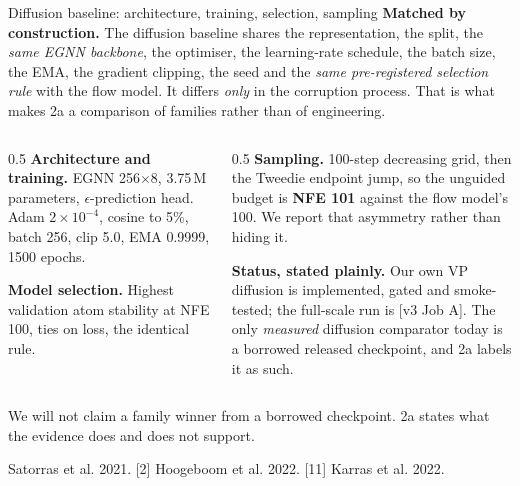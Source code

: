 \documentclass[aspectratio=169,10pt]{beamer}
\newcommand{\theslidelabel}{}
\newcommand{\lbl}[1]{\renewcommand{\theslidelabel}{#1}}
\newcommand{\srcs}[1]{\vfill{\raggedleft\color{grayt}\fontsize{4.9}{5.6}\selectfont #1\par}}
\newcommand{\TODO}[1]{\textcolor{accent}{\scriptsize[#1]}}
\newcommand{\take}[1]{\vspace{0.4ex}\colorbox{black!6}{\parbox{0.97\linewidth}{\footnotesize #1}}}
\begin{document}
\lbl{1d}
\begin{frame}{Diffusion baseline: architecture, training, selection, sampling}
  \textbf{Matched by construction.} The diffusion baseline shares the
  representation, the split, the \emph{same EGNN backbone}, the optimiser, the
  learning-rate schedule, the batch size, the EMA, the gradient clipping, the seed
  and the \emph{same pre-registered selection rule} with the flow model. It differs
  \emph{only} in the corruption process. That is what makes 2a a comparison of
  families rather than of engineering.

  \medskip
  \begin{columns}[T]
  \begin{column}{0.5\textwidth}
    \textbf{Architecture and training.} EGNN 256$\times$8, 3.75\,M parameters,
    $\epsilon$-prediction head. Adam $2\times10^{-4}$, cosine to 5\%, batch 256,
    clip 5.0, EMA 0.9999, 1500 epochs.
    \smallskip

    \textbf{Model selection.} Highest validation atom stability at NFE 100, ties on
    loss, the identical rule.
  \end{column}
  \begin{column}{0.5\textwidth}
    \textbf{Sampling.} 100-step decreasing grid, then the Tweedie endpoint jump, so
    the unguided budget is \textbf{NFE 101} against the flow model's 100. We report
    that asymmetry rather than hiding it.
    \smallskip

    \textbf{Status, stated plainly.} Our own VP diffusion is implemented, gated and
    smoke-tested; the full-scale run is \TODO{v3 Job A}. The only \emph{measured}
    diffusion comparator today is a borrowed released checkpoint, and 2a labels it
    as such.
  \end{column}
  \end{columns}

  \take{We will not claim a family winner from a borrowed checkpoint. 2a states what
  the evidence does and does not support.}

  \srcs{[9] Satorras et al. 2021. [2] Hoogeboom et al. 2022. [11] Karras et al. 2022.}
\end{frame}
\end{document}

